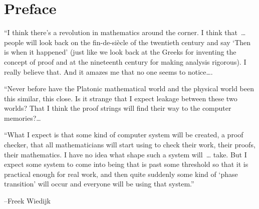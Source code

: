 
\chapter*{Preface}


%
%
%




{

\narrower

{\it

  ``I think there's a revolution in mathematics around the corner. I
  think that~\dots{}   %
  people will look back on the fin-de-si\`ecle of the twentieth century
  and say `Then is when it happened' (just like we look back at the
  Greeks for inventing the concept of proof and at the nineteenth
  century for making analysis rigorous). I really believe that. And it
  amazes me that no one seems to notice\dots.

  ``Never before have the Platonic mathematical world and the physical
  world been this similar, this close. Is it strange that I expect
  leakage between these two worlds? That I think the proof strings
  will find their way to the computer memories?\dots 

  ``What I expect is that some kind of computer system will be
  created, a proof checker, that all mathematicians will start using
  to check their work, their proofs, their mathematics. I have no idea
  what shape such a system will~\dots{}  take. But I expect some
  system to come into being that is past some threshold so that it is
  practical enough for real work, and then quite suddenly some kind of
  `phase transition' will occur and everyone will be using that
  system.''

{\hfill\rm--Freek Wiedijk~\cite{FWR}} %

}

}

